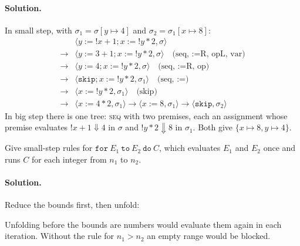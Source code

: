 \paragraph{Solution.} In small step, with $\sigma_1 = \sigma[y \mapsto 4]$ and
$\sigma_2 = \sigma_1[x \mapsto 8]$:
\[
\begin{array}{ll}
& \langle y := !x + 1 ; x := !y * 2, \sigma \rangle \\
\to & \langle y := 3 + 1 ; x := !y * 2, \sigma \rangle \quad \text{(seq, :=R, opL, var)} \\
\to & \langle y := 4 ; x := !y * 2, \sigma \rangle \quad \text{(seq, :=R, op)} \\
\to & \langle \mathtt{skip} ; x := !y * 2, \sigma_1 \rangle \quad \text{(seq, :=)} \\
\to & \langle x := !y * 2, \sigma_1 \rangle \quad \text{(skip)} \\
\to & \langle x := 4 * 2, \sigma_1 \rangle \to \langle x := 8, \sigma_1 \rangle \to \langle \mathtt{skip}, \sigma_2 \rangle
\end{array}
\]
In big step there is one tree: \textsc{seq} with two premises, each an
assignment whose premise evaluates $!x + 1 \Downarrow 4$ in $\sigma$ and $!y * 2 \Downarrow 8$
in $\sigma_1$. Both give $\{x \mapsto 8, y \mapsto 4\}$.

\begin{exercise}
Give small-step rules for $\mathtt{for}\ E_1\ \mathtt{to}\ E_2\ \mathtt{do}\ C$, which evaluates
$E_1$ and $E_2$ once and runs $C$ for each integer from $n_1$ to $n_2$.
\end{exercise}

\paragraph{Solution.} Reduce the bounds first, then unfold:
Unfolding before the bounds are numbers would evaluate them again in each
iteration. Without the rule for $n_1 > n_2$ an empty range would be blocked.

